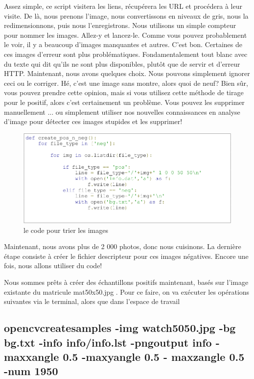 \documentclass[11pt]{report}
\begin{document}
Assez simple, ce script visitera les liens, récupérera les URL et procédera à leur visite. De
là, nous prenons l'image, nous convertissons en niveaux de gris, nous la redimensionnons,
puis nous l'enregistrons. Nous utilisons un simple compteur pour nommer les
images. Allez-y et lancez-le. Comme vous pouvez probablement le voir, il y a beaucoup
d'images manquantes et autres. C'est bon. Certaines de ces images d’erreur sont plus
problématiques. Fondamentalement tout blanc avec du texte qui dit qu'ils ne sont plus disponibles, plutôt que de servir et d'erreur HTTP. Maintenant, nous avons quelques
choix. Nous pouvons simplement ignorer ceci ou le corriger. Hé, c'est une image sans
montre, alors quoi de neuf? Bien sûr, vous pouvez prendre cette opinion, mais si vous
utilisez cette méthode de tirage pour le positif, alors c'est certainement un problème. Vous
pouvez les supprimer manuellement ... ou simplement utiliser nos nouvelles
connaissances en analyse d'image pour détecter ces images stupides et les supprimer!



\begin{figure}[H]
	\begin{center}
		\includegraphics[width=12cm]{images/codeneg.png}
		\caption{le code pour trier les images}
		\label{fig:figure}
	\end{center}
\end{figure}

Maintenant, nous avons plus de 2 000 photos, donc nous cuisinons. La dernière étape
consiste à créer le fichier descripteur pour ces images négatives. Encore une fois, nous
allons utiliser du code!

Nous sommes prêts à créer des échantillons positifs maintenant, basés sur l’image
existante du matricule mat50x50.jpg . Pour ce faire, on va exécuter les opérations
suivantes via le terminal, alors que dans l'espace de travail

\subsection*{opencvcreatesamples -img watch5050.jpg -bg bg.txt -info
	info/info.lst -pngoutput info -maxxangle 0.5 -maxyangle 0.5 -
	maxzangle 0.5 -num 1950}
\end{document}
